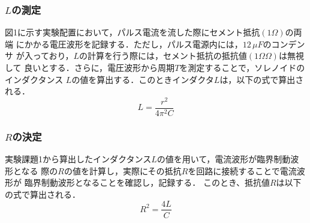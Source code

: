 \subsubsection{$L$の測定}
図1に示す実験配置において，パルス電流を流した際にセメント抵抗$(1\Omega)$の両端
にかかる電圧波形を記録する．ただし，パルス電源内には，$12\,\si{\mu F}$のコンデンサ
が入っており，$L$の計算を行う際には，セメント抵抗の抵抗値$(1Ω\Omega)$は無視して
良いとする．さらに，電圧波形から周期$T$を測定することで，ソレノイドのインダクタンス
$L$の値を算出する．このときインダクタ$L$は，以下の式で算出される．
$$
L=\frac{r^2}{4\pi^2C}
$$


\subsubsection{$R$の決定}
実験課題1から算出したインダクタンス$L$の値を用いて，電流波形が臨界制動波形となる
際の$R$の値を計算し，実際にその抵抗$R$を回路に接続することで電流波形が
臨界制動波形となることを確認し，記録する．
このとき、抵抗値$R$は以下の式で算出される．
$$
R^2=\frac{4L}{C}
$$